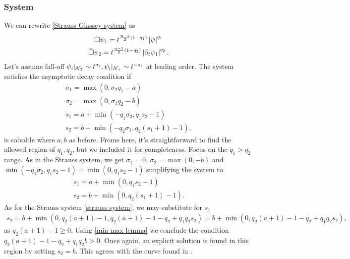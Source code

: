 \documentclass[11pt, oneside]{amsart}
\begin{document}
	\subsubsection{System}\label{strauss glassey system}
	We can rewrite \eqref{Strauss Glassey system} as
	\begin{equation*}
		\begin{gathered}
			\tilde{\Box}\psi_1=t^{\frac{n-1}{2}(1-q_1)}\left\lvert \psi\right\rvert^{q_1}\\
			\tilde{\Box}\psi_2=t^{\frac{n-1}{2}(1-q_2)}\left\lvert \partial_t\psi_1\right\rvert^{q_2}.
		\end{gathered}
	\end{equation*}
	Let's assume fall-off $\psi_i|_{\mathcal{N}_{\mathcal{I}}}\sim t^{\sigma_i},\psi_i|_{\mathcal{N}_+}\sim t^{-s_i}$ at leading order. The system satisfies the asymptotic decay condition if
	\begin{equation*}
		\begin{gathered}
			\sigma_1=\max(0,\sigma_2q_1-a)\\
			\sigma_2=\max(0,\sigma_1q_2-b)\\
			s_1=a+\min(-q_1\sigma_2,q_1s_2-1)\\
			s_2=b+\min(-q_2\sigma_1,q_2(s_1+1)-1),
		\end{gathered}
	\end{equation*}
	is solvable where $a,b$ as before. Frome here, it's straightforward to find the allowed region of $q_1,q_2$, but we included it for completeness. Focus on the $q_1>q_2$ range. As in the Strauss system, we get $\sigma_1=0,\,\sigma_2=\max(0,-b)$  and $\min(-q_1\sigma_2,q_1s_2-1)=\min(0,q_1s_2-1)$ simplifying the system to
	\begin{equation*}
		\begin{gathered}
			s_1=a+\min(0,q_1s_2-1)\\
			s_2=b+\min(0,q_2(s_1+1)-1).
		\end{gathered}
	\end{equation*}
	As for the Strauss system \cref{strauss system}, we may substitute for $s_1$
	\begin{equation*}
		\begin{gathered}
			s_2=b+\min(0,q_2(a+1)-1,q_2(a+1)-1-q_2+q_1q_2s_2)=b+\min(0,q_2(a+1)-1-q_2+q_1q_2s_2),
		\end{gathered}
	\end{equation*}
	as $q_2(a+1)-1\geq0$. Using \cref{min max lemma} we conclude the condition $q_2(a+1)-1-q_2+q_1q_2b>0$. Once again, an explicit solution is found in this region by setting $s_2=b$. This agrees with the curve found in \cite{hidano_combined_2016}.
	
\end{document}

